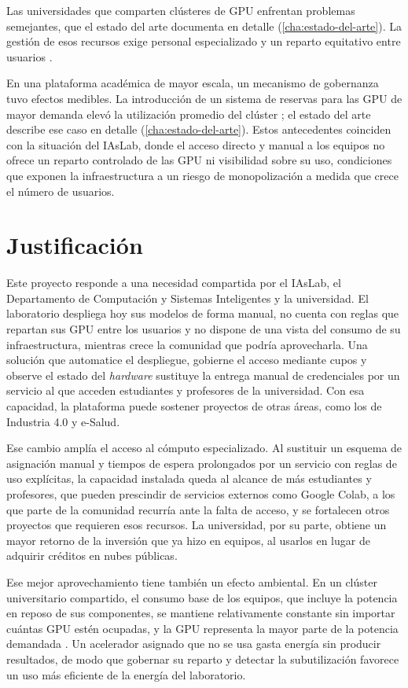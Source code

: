 Las universidades que comparten clústeres de GPU enfrentan problemas semejantes, que el estado del arte documenta en detalle (\cref{cha:estado-del-arte}). La gestión de esos recursos exige personal especializado y un reparto equitativo entre usuarios \citep{xu-sing-2025}.

En una plataforma académica de mayor escala, un mecanismo de gobernanza tuvo efectos medibles. La introducción de un sistema de reservas para las GPU de mayor demanda elevó la utilización promedio del clúster \citep{weitzel-nrpreservation-2025}; el estado del arte describe ese caso en detalle (\cref{cha:estado-del-arte}). Estos antecedentes coinciden con la situación del IAsLab, donde el acceso directo y manual a los equipos no ofrece un reparto controlado de las GPU ni visibilidad sobre su uso, condiciones que exponen la infraestructura a un riesgo de monopolización a medida que crece el número de usuarios.

\section{Justificación}

Este proyecto responde a una necesidad compartida por el IAsLab, el Departamento de Computación y Sistemas Inteligentes y la universidad. El laboratorio despliega hoy sus modelos de forma manual, no cuenta con reglas que repartan sus GPU entre los usuarios y no dispone de una vista del consumo de su infraestructura, mientras crece la comunidad que podría aprovecharla. Una solución que automatice el despliegue, gobierne el acceso mediante cupos y observe el estado del \emph{hardware} sustituye la entrega manual de credenciales por un servicio al que acceden estudiantes y profesores de la universidad. Con esa capacidad, la plataforma puede sostener proyectos de otras áreas, como los de Industria 4.0 y e-Salud.

Ese cambio amplía el acceso al cómputo especializado. Al sustituir un esquema de asignación manual y tiempos de espera prolongados por un servicio con reglas de uso explícitas, la capacidad instalada queda al alcance de más estudiantes y profesores, que pueden prescindir de servicios externos como Google Colab, a los que parte de la comunidad recurría ante la falta de acceso, y se fortalecen otros proyectos que requieren esos recursos. La universidad, por su parte, obtiene un mayor retorno de la inversión que ya hizo en equipos, al usarlos en lugar de adquirir créditos en nubes públicas.

Ese mejor aprovechamiento tiene también un efecto ambiental. En un clúster universitario compartido, el consumo base de los equipos, que incluye la potencia en reposo de sus componentes, se mantiene relativamente constante sin importar cuántas GPU estén ocupadas, y la GPU representa la mayor parte de la potencia demandada \citep{xu-sing-2025}. Un acelerador asignado que no se usa gasta energía sin producir resultados, de modo que gobernar su reparto y detectar la subutilización favorece un uso más eficiente de la energía del laboratorio.

